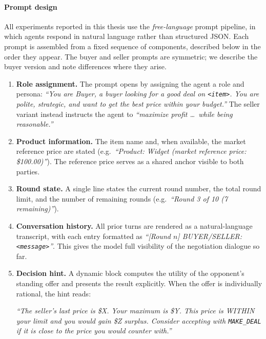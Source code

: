 \paragraph{Prompt design}
\label{sec:prompt-design}

All experiments reported in this thesis use the \emph{free-language} prompt pipeline, in which agents respond in natural language rather than structured JSON. Each prompt is assembled from a fixed sequence of components, described below in the order they appear. The buyer and seller prompts are symmetric; we describe the buyer version and note differences where they arise.

\begin{enumerate}

\item \textbf{Role assignment.}
The prompt opens by assigning the agent a role and persona: 
\textit{``You are Buyer, a buyer looking for a good deal on \texttt{<item>}. You are polite, strategic, and want to get the best price within your budget.''}
The seller variant instead instructs the agent to \textit{``maximize profit \ldots\ while being reasonable.''}

\item \textbf{Product information.}
The item name and, when available, the market reference price are stated (e.g.\ 
\textit{``Product: Widget (market reference price: \$100.00)''}).
The reference price serves as a shared anchor visible to both parties.

\item \textbf{Round state.}
A single line states the current round number, the total round limit, and the number of remaining rounds (e.g.\ 
\textit{``Round 3 of 10 (7 remaining)''}).

\item \textbf{Conversation history.}
All prior turns are rendered as a natural-language transcript, with each entry formatted as 
\textit{``[Round $n$] BUYER/SELLER: \texttt{<message>}''}.
This gives the model full visibility of the negotiation dialogue so far.

\item \textbf{Decision hint.}
A dynamic block computes the utility of the opponent's standing offer and presents the result explicitly. 
When the offer is individually rational, the hint reads:

\textit{``The seller's last price is \$X. Your maximum is \$Y. This price is WITHIN your limit and you would gain \$Z surplus. Consider accepting with \texttt{MAKE\_\allowbreak DEAL} if it is close to the price you would counter with.''}


\end{enumerate}
